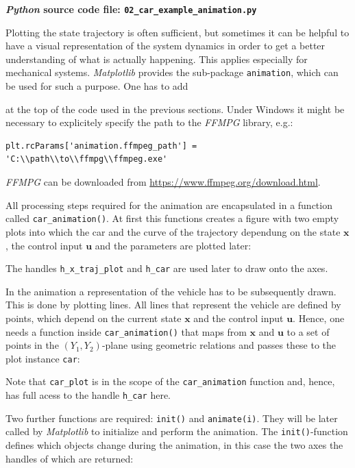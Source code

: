 \documentclass[a4paper,11pt,headinclude=true,headsepline,parskip=half,DIV=13]{scrartcl}
\newcommand{\listcode}[3]{}
\newcommand{\listcodeanim}[2]{\listcode{#1}{#2}{../sim/02_car_example_animation.py}}
\newcommand{\py}{\emph{Python}\xspace}
\newcommand{\mpl}{\emph{Matplotlib}\xspace}
\newcommand{\uu}{\mathbf{u}}
\newcommand{\x}{\mathbf{x}}
\begin{document}
\textbf{\py source code file: \texttt{02\_car\_example\_animation.py}}

Plotting the state trajectory is often sufficient, but sometimes it can be helpful to have a visual representation of the system dynamics in order to get a better understanding of what is actually happening. This applies especially for mechanical systems. \mpl provides the sub-package \texttt{animation}, which can be used for such a purpose. One has to add
\listcodeanim{6}{6}
at the top of the code used in the previous sections. Under Windows it might be necessary to explicitely specify the path to the \emph{FFMPG} library, e.g.:
\begin{lstlisting}
plt.rcParams['animation.ffmpeg_path'] = 'C:\\path\\to\\ffmpg\\ffmpeg.exe'
\end{lstlisting}
\emph{FFMPG} can be downloaded from \url{https://www.ffmpeg.org/download.html}.

All processing steps required for the animation are encapsulated in a function called \texttt{car\_animation()}. At first this functions creates a figure with two empty plots into which the car and the curve of the trajectory dependung on the state $\x$, the control input $\uu$ and the parameters are plotted later:
\listcodeanim{137}{165}
The handles \texttt{h\_x\_traj\_plot} and \texttt{h\_car} are used later to draw onto the axes.

In the animation a representation of the vehicle has to be subsequently drawn. This is done by plotting lines. All lines that represent the vehicle are defined by points, which depend on the current state $\x$ and the control input $\uu$. Hence, one needs a function inside \texttt{car\_animation()} that maps from $\x$ and $\uu$ to a set of points in the $(Y_1,Y_2)$-plane using geometric relations and passes these to the plot instance \texttt{car}:
\listcodeanim{167}{223}
Note that \texttt{car\_plot} is in the scope of the \texttt{car\_animation} function and, hence, has full acess to the handle \texttt{h\_car} here.

Two further functions are required: \texttt{init()} and \texttt{animate(i)}. They will be later called by \mpl to initialize and perform the animation. The \texttt{init()}-function defines which objects change during the animation, in this case the two axes the handles of which are returned:
\listcodeanim{225}{234}
\end{document}

